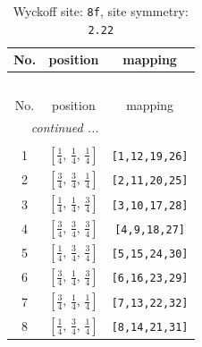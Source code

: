 \documentclass[fleqn,8pt]{jsarticle}
\begin{document}
\begin{longtable}{ccc}
\caption{Wyckoff site: {\tt 8f}, site symmetry: {\tt 2.22}}
 \\
 \hline \hline
No. & position & mapping \\ \hline \endfirsthead

\multicolumn{2}{l}{\tablename\ \thetable{}} \\
 \hline \hline
No. & position & mapping \\ \hline \endhead

 \hline \hline
\multicolumn{2}{r}{\footnotesize\it continued ...} \\ \endfoot

 \hline \hline
\multicolumn{2}{r}{} \\ \endlastfoot

1 & $\left[ \frac{1}{4},\, \frac{1}{4},\, \frac{1}{4} \right]$ & {\tt [1,12,19,26]} \\ \hline
2 & $\left[ \frac{3}{4},\, \frac{3}{4},\, \frac{1}{4} \right]$ & {\tt [2,11,20,25]} \\ \hline
3 & $\left[ \frac{1}{4},\, \frac{1}{4},\, \frac{3}{4} \right]$ & {\tt [3,10,17,28]} \\ \hline
4 & $\left[ \frac{3}{4},\, \frac{3}{4},\, \frac{3}{4} \right]$ & {\tt [4,9,18,27]} \\ \hline
5 & $\left[ \frac{1}{4},\, \frac{3}{4},\, \frac{3}{4} \right]$ & {\tt [5,15,24,30]} \\ \hline
6 & $\left[ \frac{3}{4},\, \frac{1}{4},\, \frac{3}{4} \right]$ & {\tt [6,16,23,29]} \\ \hline
7 & $\left[ \frac{3}{4},\, \frac{1}{4},\, \frac{1}{4} \right]$ & {\tt [7,13,22,32]} \\ \hline
8 & $\left[ \frac{1}{4},\, \frac{3}{4},\, \frac{1}{4} \right]$ & {\tt [8,14,21,31]} \\
\end{longtable}
\renewcommand{\arraystretch}{1.2}
\end{document}

